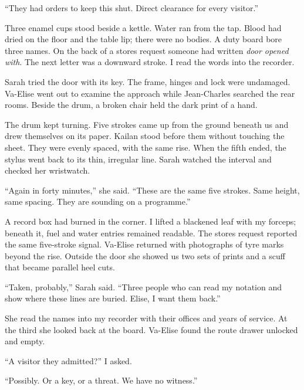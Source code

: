 ``They had orders to keep this shut. Direct clearance for every visitor.''\par

Three enamel cups stood beside a kettle. Water ran from the tap. Blood had dried on the floor and the table lip; there were no bodies. A duty board bore three names. On the back of a stores request someone had written \emph{door opened with}. The next letter was a downward stroke. I read the words into the recorder.\par

Sarah tried the door with its key. The frame, hinges and lock were undamaged. Va-Elise went out to examine the approach while Jean-Charles searched the rear rooms. Beside the drum, a broken chair held the dark print of a hand.\par

The drum kept turning. Five strokes came up from the ground beneath us and drew themselves on its paper. Kailan stood before them without touching the sheet. They were evenly spaced, with the same rise. When the fifth ended, the stylus went back to its thin, irregular line. Sarah watched the interval and checked her wristwatch.\par

``Again in forty minutes,'' she said. ``These are the same five strokes. Same height, same spacing. They are sounding on a programme.''\par

A record box had burned in the corner. I lifted a blackened leaf with my forceps; beneath it, fuel and water entries remained readable. The stores request reported the same five-stroke signal. Va-Elise returned with photographs of tyre marks beyond the rise. Outside the door she showed us two sets of prints and a scuff that became parallel heel cuts.\par

``Taken, probably,'' Sarah said. ``Three people who can read my notation and show where these lines are buried. Elise, I want them back.''\par

She read the names into my recorder with their offices and years of service. At the third she looked back at the board. Va-Elise found the route drawer unlocked and empty.\par

``A visitor they admitted?'' I asked.\par

``Possibly. Or a key, or a threat. We have no witness.''\par

